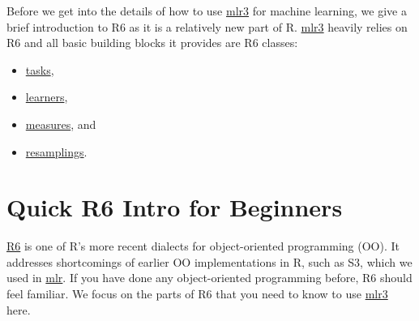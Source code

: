 \documentclass[
]{scrbook}
\providecommand{\tightlist}{%
  \setlength{\itemsep}{0pt}\setlength{\parskip}{0pt}}
\begin{document}
\(~~~~~~~~~~~\)

Before we get into the details of how to use \href{https://mlr3.mlr-org.com}{mlr3} for machine learning, we give a brief introduction to R6 as it is a relatively new part of R.
\href{https://mlr3.mlr-org.com}{mlr3} heavily relies on R6 and all basic building blocks it provides are R6 classes:

\begin{itemize}
\tightlist
\item
  \protect\hyperlink{tasks}{tasks},
\item
  \protect\hyperlink{learners}{learners},
\item
  \protect\hyperlink{list-measures}{measures}, and
\item
  \protect\hyperlink{resampling}{resamplings}.
\end{itemize}

\hypertarget{r6}{%
\section{Quick R6 Intro for Beginners}\label{r6}}

\href{https://cran.r-project.org/package=R6}{R6} is one of R's more recent dialects for object-oriented programming (OO).
It addresses shortcomings of earlier OO implementations in R, such as S3, which we used in \href{https://mlr.mlr-org.com}{mlr}.
If you have done any object-oriented programming before, R6 should feel familiar.
We focus on the parts of R6 that you need to know to use \href{https://mlr3.mlr-org.com}{mlr3} here.
\end{document}
